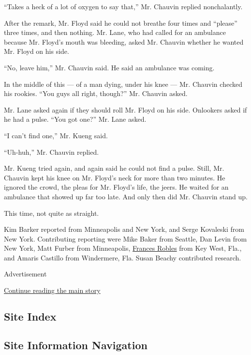 ``Takes a heck of a lot of oxygen to say that,'' Mr. Chauvin replied
nonchalantly.

After the remark, Mr. Floyd said he could not breathe four times and
``please'' three times, and then nothing. Mr. Lane, who had called for
an ambulance because Mr. Floyd's mouth was bleeding, asked Mr. Chauvin
whether he wanted Mr. Floyd on his side.

``No, leave him,'' Mr. Chauvin said. He said an ambulance was coming.

In the middle of this --- of a man dying, under his knee --- Mr. Chauvin
checked his rookies. ``You guys all right, though?'' Mr. Chauvin asked.

Mr. Lane asked again if they should roll Mr. Floyd on his side.
Onlookers asked if he had a pulse. ``You got one?'' Mr. Lane asked.

``I can't find one,'' Mr. Kueng said.

``Uh-huh,'' Mr. Chauvin replied.

Mr. Kueng tried again, and again said he could not find a pulse. Still,
Mr. Chauvin kept his knee on Mr. Floyd's neck for more than two minutes.
He ignored the crowd, the pleas for Mr. Floyd's life, the jeers. He
waited for an ambulance that showed up far too late. And only then did
Mr. Chauvin stand up.

This time, not quite as straight.

Kim Barker reported from Minneapolis and New York, and Serge Kovaleski
from New York. Contributing reporting were Mike Baker from Seattle, Dan
Levin from New York, Matt Furber from Minneapolis,
\href{https://www.nytimes3xbfgragh.onion/by/frances-robles}{Frances
Robles} from Key West, Fla., and Amaris Castillo from Windermere, Fla.
Susan Beachy contributed research.

Advertisement

\protect\hyperlink{after-bottom}{Continue reading the main story}

\hypertarget{site-index}{%
\subsection{Site Index}\label{site-index}}

\hypertarget{site-information-navigation}{%
\subsection{Site Information
Navigation}\label{site-information-navigation}}

